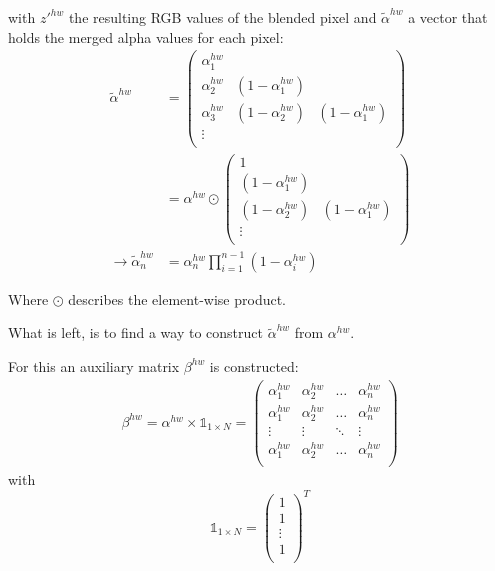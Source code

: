 with $z'^{hw}$ the resulting RGB values of the blended pixel and $\tilde{\alpha}^{hw}$
a vector that holds the merged alpha values for each pixel:
\begin{align}
    \tilde{\alpha}^{hw} & =
    \begin{pmatrix}
        \alpha^{hw}_1 & &\\
        \alpha^{hw}_2 & (1 - \alpha^{hw}_1) &\\
        \alpha^{hw}_3 & (1 - \alpha^{hw}_2) & (1 - \alpha^{hw}_1)\\
        \vdots & &\\
    \end{pmatrix}
    \\
    & = \alpha^{hw} \odot 
    \begin{pmatrix}
        1  &\\
        (1 - \alpha^{hw}_1) &\\
        (1 - \alpha^{hw}_2) & (1 - \alpha^{hw}_1)\\
        \vdots &\\
    \end{pmatrix}
    \\
    \rightarrow  \tilde{\alpha}^{hw}_n & = \alpha^{hw}_n \prod^{n-1}_{i=1} (1 - \alpha^{hw}_i)
\end{align}

Where $\odot$ describes the element-wise product.

What is left, is to find a way to construct $\tilde{\alpha}^{hw}$ from $\alpha^{hw}$.

For this an auxiliary matrix $\beta^{hw}$ is constructed:
\begin{align}
    \beta^{hw} = \alpha^{hw} \times \mathbb{1}_{1 \times N} = 
    \begin{pmatrix}
        \alpha^{hw}_1 & \alpha^{hw}_2 & \hdots & \alpha^{hw}_n\\
        \alpha^{hw}_1 & \alpha^{hw}_2 & \hdots & \alpha^{hw}_n\\
        \vdots & \vdots & \ddots & \vdots \\
        \alpha^{hw}_1 & \alpha^{hw}_2 & \hdots & \alpha^{hw}_n\\
    \end{pmatrix}
\end{align}
with
$$
\mathbb{1}_{1 \times N} = \begin{pmatrix}
        1 \\
        1 \\
        \vdots\\
        1 \\
    \end{pmatrix}^T
$$

